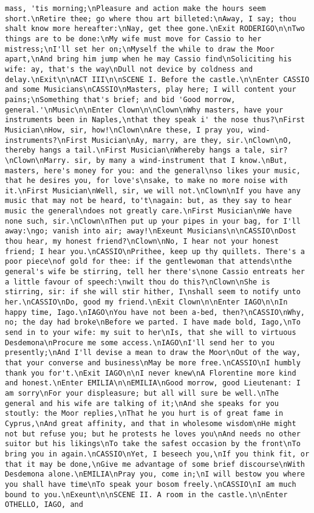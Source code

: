 \begin{verbatim}
mass, 'tis morning;\nPleasure and action make the hours seem short.\nRetire thee; go where thou art billeted:\nAway, I say; thou shalt know more hereafter:\nNay, get thee gone.\nExit RODERIGO\n\nTwo things are to be done:\nMy wife must move for Cassio to her mistress;\nI'll set her on;\nMyself the while to draw the Moor apart,\nAnd bring him jump when he may Cassio find\nSoliciting his wife: ay, that's the way\nDull not device by coldness and delay.\nExit\n\nACT III\n\nSCENE I. Before the castle.\n\nEnter CASSIO and some Musicians\nCASSIO\nMasters, play here; I will content your pains;\nSomething that's brief; and bid 'Good morrow, general.'\nMusic\n\nEnter Clown\n\nClown\nWhy masters, have your instruments been in Naples,\nthat they speak i' the nose thus?\nFirst Musician\nHow, sir, how!\nClown\nAre these, I pray you, wind-instruments?\nFirst Musician\nAy, marry, are they, sir.\nClown\nO, thereby hangs a tail.\nFirst Musician\nWhereby hangs a tale, sir?\nClown\nMarry. sir, by many a wind-instrument that I know.\nBut, masters, here's money for you: and the general\nso likes your music, that he desires you, for love's\nsake, to make no more noise with it.\nFirst Musician\nWell, sir, we will not.\nClown\nIf you have any music that may not be heard, to't\nagain: but, as they say to hear music the general\ndoes not greatly care.\nFirst Musician\nWe have none such, sir.\nClown\nThen put up your pipes in your bag, for I'll away:\ngo; vanish into air; away!\nExeunt Musicians\n\nCASSIO\nDost thou hear, my honest friend?\nClown\nNo, I hear not your honest friend; I hear you.\nCASSIO\nPrithee, keep up thy quillets. There's a poor piece\nof gold for thee: if the gentlewoman that attends\nthe general's wife be stirring, tell her there's\none Cassio entreats her a little favour of speech:\nwilt thou do this?\nClown\nShe is stirring, sir: if she will stir hither, I\nshall seem to notify unto her.\nCASSIO\nDo, good my friend.\nExit Clown\n\nEnter IAGO\n\nIn happy time, Iago.\nIAGO\nYou have not been a-bed, then?\nCASSIO\nWhy, no; the day had broke\nBefore we parted. I have made bold, Iago,\nTo send in to your wife: my suit to her\nIs, that she will to virtuous Desdemona\nProcure me some access.\nIAGO\nI'll send her to you presently;\nAnd I'll devise a mean to draw the Moor\nOut of the way, that your converse and business\nMay be more free.\nCASSIO\nI humbly thank you for't.\nExit IAGO\n\nI never knew\nA Florentine more kind and honest.\nEnter EMILIA\n\nEMILIA\nGood morrow, good Lieutenant: I am sorry\nFor your displeasure; but all will sure be well.\nThe general and his wife are talking of it;\nAnd she speaks for you stoutly: the Moor replies,\nThat he you hurt is of great fame in Cyprus,\nAnd great affinity, and that in wholesome wisdom\nHe might not but refuse you; but he protests he loves you\nAnd needs no other suitor but his likings\nTo take the safest occasion by the front\nTo bring you in again.\nCASSIO\nYet, I beseech you,\nIf you think fit, or that it may be done,\nGive me advantage of some brief discourse\nWith Desdemona alone.\nEMILIA\nPray you, come in;\nI will bestow you where you shall have time\nTo speak your bosom freely.\nCASSIO\nI am much bound to you.\nExeunt\n\nSCENE II. A room in the castle.\n\nEnter OTHELLO, IAGO, and 
\end{verbatim}
